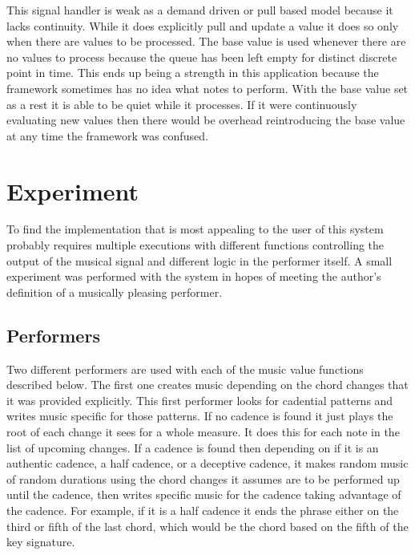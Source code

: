 \documentclass[12pt]{ucthesis}
\begin{document}
This signal handler is weak as a demand driven or pull based model because it lacks continuity. While it does explicitly pull and update a value it does so only when there are values to be processed. The base value is used whenever there are no values to process because the queue has been left empty for distinct discrete point in time. This ends up being a strength in this application because the framework sometimes has no idea what notes to perform. With the base value set as a rest it is able to be quiet while it processes. If it were continuously evaluating new values then there would be overhead reintroducing the base value at any time the framework was confused. 


\chapter{Experiment}
\label {experiment}
To find the implementation that is most appealing to the user of this system probably requires multiple executions with different functions controlling the output of the musical signal and different logic in the performer itself. A small experiment was performed with the system in hopes of meeting the author's definition of a musically pleasing performer. 

\section{Performers}
\label {performers}

Two different performers are used with each of the music value functions described below. The first one creates music depending on the chord changes that it was provided explicitly. This first performer looks for cadential patterns and writes music specific for those patterns. If no cadence is found it just plays the root of each change it sees for a whole measure. It does this for each note in the list of upcoming changes. If a cadence is found then depending on if it is an authentic cadence, a half cadence, or a deceptive cadence, it makes random music of random durations using the chord changes it assumes are to be performed up until the cadence, then writes specific music for the cadence taking advantage of the cadence. For example, if it is a half cadence it ends the phrase either on the third or fifth of the last chord, which would be the chord based on the fifth of the key signature.
\end{document}
